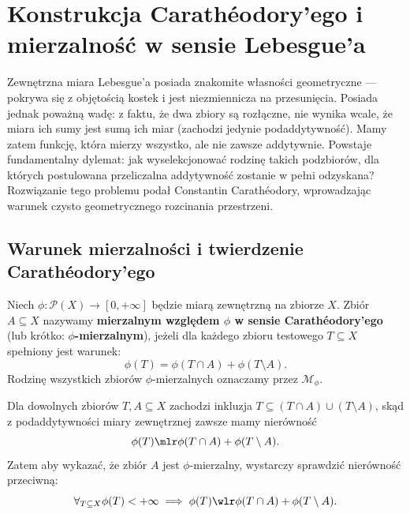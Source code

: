 \section{Konstrukcja Carathéodory'ego i mierzalność w sensie Lebesgue'a}
Zewnętrzna miara Lebesgue'a posiada znakomite własności geometryczne — pokrywa się z objętością kostek i jest niezmiennicza na przesunięcia. Posiada jednak poważną wadę: z faktu, że dwa zbiory są rozłączne, nie wynika wcale, że miara ich sumy jest sumą ich miar (zachodzi jedynie podaddytywność). Mamy zatem funkcję, która mierzy wszystko, ale nie zawsze addytywnie. Powstaje fundamentalny dylemat: jak wyselekcjonować rodzinę takich podzbiorów, dla których postulowana przeliczalna addytywność zostanie w pełni odzyskana? Rozwiązanie tego problemu podał Constantin Carathéodory, wprowadzając warunek czysto geometrycznego rozcinania przestrzeni.

\subsection{Warunek mierzalności i twierdzenie Carathéodory'ego} \begin{defi} Niech $\phi \colon \mathcal{P}(X) \to [0, +\infty]$ będzie miarą zewnętrzną na zbiorze $X$. Zbiór $A \subseteq X$ nazywamy \textbf{mierzalnym względem $\phi$ w sensie Carathéodory'ego} (lub krótko: \textbf{$\phi$-mierzalnym}), jeżeli dla każdego zbioru testowego $T \subseteq X$ spełniony jest warunek:
    \begin{equation}\label{eq:caratheodory_condition}
        \phi(T) = \phi(T \cap A) + \phi(T \setminus A).
    \end{equation}
    Rodzinę wszystkich zbiorów $\phi$-mierzalnych oznaczamy przez $\mathcal{M}_\phi$.
\end{defi}
\begin{uwaga}
    Dla dowolnych zbiorów $T, A \subseteq X$ zachodzi inkluzja $T \subseteq (T \cap A) \cup (T \setminus A)$, skąd z podaddytywności miary zewnętrznej zawsze mamy nierówność
    \begin{equation*}
        \phi(T) \mlr \phi(T \cap A) + \phi(T \setminus A).
    \end{equation*}
    Zatem aby wykazać, że zbiór $A$ jest $\phi$-mierzalny, wystarczy sprawdzić nierówność przeciwną:
    \begin{equation}\label{eq:carath_reduced}
        \forall_{T \subseteq X} \phi(T) < +\infty \implies \phi(T) \wlr \phi(T \cap A) + \phi(T \setminus A).
    \end{equation}
\end{uwaga}

